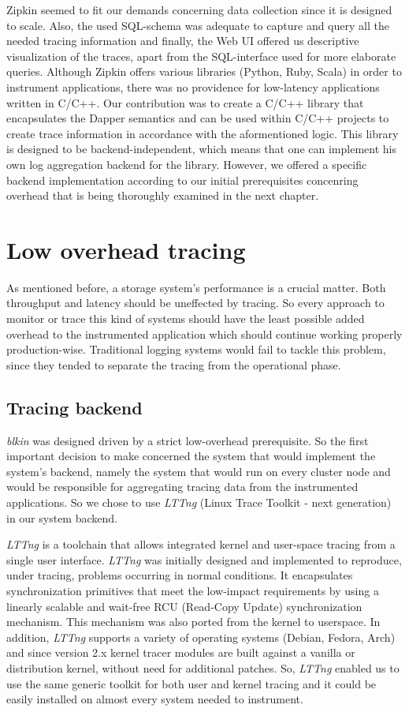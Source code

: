 \documentclass[a4paper,10pt,twocolumn]{article}
\begin{document}
Zipkin seemed to fit our demands concerning data collection since it is designed
to scale. Also, the used SQL-schema was adequate to capture and query all the 
needed tracing information and finally, the Web UI offered us descriptive 
visualization of the traces, apart from the SQL-interface used for more 
elaborate queries. Although Zipkin offers various libraries (Python, Ruby, 
Scala) in order to instrument applications, there was no providence for 
low-latency applications written in C/C++. Our contribution was to create a 
C/C++ library that encapsulates the Dapper semantics and can be used within 
C/C++ projects to create trace information in accordance with the aformentioned
logic. This library is designed to be backend-independent, which means that one
can implement his own log aggregation backend for the library. However, we 
offered a specific backend implementation according to our initial prerequisites 
concenring overhead that is being thoroughly examined in the next chapter.

\section{Low overhead tracing}
As mentioned before, a storage system's performance is a crucial matter. Both 
throughput and latency should be uneffected by tracing. So every approach to 
monitor or trace this kind of systems should have the least possible added 
overhead to the instrumented application which should continue working properly
production-wise. Traditional logging systems would fail to tackle this problem,
since they tended to separate the tracing from the operational phase.

\subsection{Tracing backend}
\emph{blkin} was designed driven by a strict low-overhead prerequisite. So the 
first important decision to make concerned the system that would implement the
system's backend, namely the system that would run on every cluster node and 
would be responsible for aggregating tracing data from the instrumented 
applications. So we chose to use \emph{LTTng} (Linux Trace Toolkit - 
next generation)\cite{lttng} in our system backend.

\emph{LTTng} is a toolchain that allows integrated kernel and user-space tracing
from a single user interface. \emph{LTTng} was initially designed and 
implemented to reproduce, under tracing, problems occurring in normal 
conditions. It encapsulates synchronization primitives that meet the low-impact
requirements by using a linearly scalable and wait-free RCU (Read-Copy Update) 
synchronization mechanism. This mechanism was also ported from the kernel to 
userspace. In addition, \emph{LTTng} supports a variety of operating systems
(Debian, Fedora, Arch) and since version 2.x kernel tracer modules are built 
against a vanilla or distribution kernel, without need for additional patches.
So, \emph{LTTng} enabled us to use the same generic toolkit for both user and 
kernel tracing and it could be easily installed on almost every system needed
to instrument. 
\end{document}
